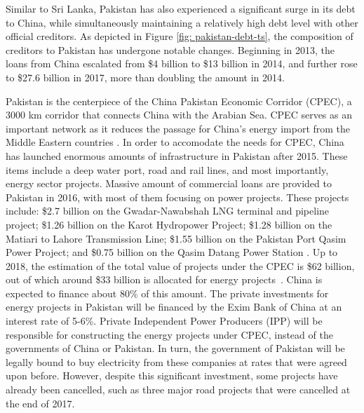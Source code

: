Similar to Sri Lanka, Pakistan has also experienced a significant surge in its debt to China, while simultaneously maintaining a relatively high debt level with other official creditors. As depicted in Figure \ref{fig: pakistan-debt-ts}, the composition of creditors to Pakistan has undergone notable changes.  Beginning in 2013, the loans from China escalated from \$4 billion to \$13 billion in 2014, and further rose to \$27.6 billion in 2017, more than doubling the amount in 2014.

Pakistan is the centerpiece of the China Pakistan Economic Corridor (CPEC), a 3000 km corridor that connects China with the Arabian Sea.
CPEC serves as an important network as it reduces the passage for China's energy import from the Middle Eastern countries \citep*{CPEC-wiki}.
In order to accomodate the needs for CPEC, China has launched enormous amounts of infrastructure in Pakistan after 2015. These items include a deep water port, road and rail lines, and most importantly, energy sector projects.
Massive amount of commercial loans are provided to Pakistan in 2016, with most of them focusing on power projects.
These projects include:
\$2.7 billion on the Gwadar-Nawabshah LNG terminal and pipeline project;
\$1.26 billion on the Karot Hydropower Project;
\$1.28 billion on the Matiari to Lahore Transmission Line;
\$1.55 billion on the Pakistan Port Qasim Power Project; and \$0.75 billion on the Qasim Datang Power Station \citep*{Horn-Reinhart-Trebesch-21}.
Up to 2018, the estimation of the total value of projects under the CPEC is \$62 billion, out of which around \$33 billion is allocated for energy projects~\citep*{Hurley19-8-debt-trap}. China is expected to finance about 80\% of this amount. The private investments for energy projects in Pakistan will be financed by the Exim Bank of China at an interest rate of 5-6\%.
Private Independent Power Producers (IPP) will be responsible for constructing the energy projects under CPEC, instead of the governments of China or Pakistan. In turn, the government of Pakistan will be legally bound to buy electricity from these companies at rates that were agreed upon before.
However, despite this significant investment, some projects have already been cancelled, such as three major road projects that were cancelled at the end of 2017\citep*{Hurley19-8-debt-trap}.

